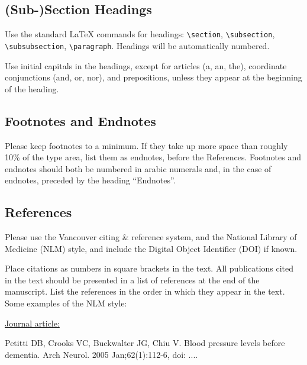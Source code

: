 \documentclass{IOS-Book-Article}
\begin{document}
\subsection{(Sub-)Section Headings}
Use the standard \LaTeX{} commands for headings: {\small \verb|\section|, \verb|\subsection|, \verb|\subsubsection|, \verb|\paragraph|}.
Headings will be automatically numbered.

Use initial capitals in the headings, except for articles (a, an, the), coordinate
conjunctions (and, or, nor), and prepositions, unless they appear at the beginning
of the heading.

\subsection{Footnotes and Endnotes}
Please keep footnotes to a minimum. If they take up more space than roughly 10\% of
the type area, list them as endnotes, before the References. Footnotes and endnotes
should both be numbered in arabic numerals and, in the case of endnotes, preceded by
the heading ``Endnotes''.

\subsection{References}

Please use the Vancouver citing \& reference system, and the National Library of
Medicine (NLM) style, and include the Digital Object Identifier (DOI) if known.

Place citations as numbers in square brackets in the text. All publications cited in
the text should be presented in a list of references at the end of the manuscript.
List the references in the order in which they appear in the text. Some examples of
the NLM style:

\medskip
\noindent\ul{Journal article:}\par\noindent
Petitti DB, Crooks VC, Buckwalter JG, Chiu V. Blood pressure levels before dementia.
Arch Neurol. 2005 Jan;62(1):112-6, doi: ....
\end{document}
